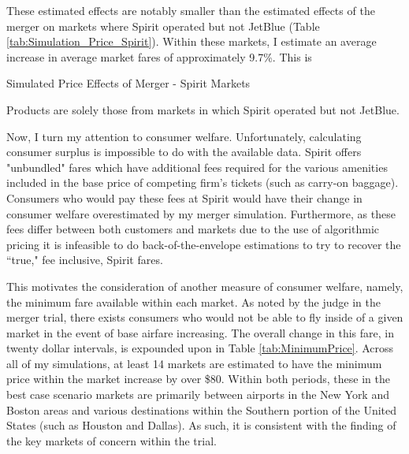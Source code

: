 \documentclass{article}
\begin{document}
    These estimated effects are notably smaller than the estimated effects of the merger on markets where Spirit operated but not JetBlue (Table \ref{tab:Simulation_Price_Spirit}). Within these markets, I estimate an average increase in average market fares of approximately 9.7\%. This is 

    \begin{table}
        \caption{Simulated Price Effects of Merger - Spirit Markets}
        \label{tab:Simulation_Price_Spirit}
                        \vspace{-15mm}
        \begin{center}
              
              \footnotesize{Products are solely those from markets in which Spirit operated but not JetBlue.}
        \end{center}
    \end{table}


     Now, I turn my attention to consumer welfare. Unfortunately, calculating consumer surplus is impossible to do with the available data. Spirit offers "unbundled" fares which have additional fees required for the various amenities included in the base price of competing firm's tickets (such as carry-on baggage). Consumers who would pay these fees at Spirit would have their change in consumer welfare overestimated by my merger simulation. Furthermore, as these fees differ between both customers and markets due to the use of algorithmic pricing \citep{senate_permanent_committee_on_investigations_majority_2024} it is infeasible to do back-of-the-envelope estimations to try to recover the ``true," fee inclusive, Spirit fares. 
     
     This motivates the consideration of another measure of consumer welfare, namely, the minimum fare available within each market. As noted by the judge in the merger trial, there exists consumers who would not be able to fly inside of a given market in the event of base airfare increasing. The overall change in this fare, in twenty dollar intervals, is expounded upon in Table \ref{tab:MinimumPrice}. Across all of my simulations, at least 14 markets are estimated to have the minimum price within the market increase by over \$80. Within both periods, these in the best case scenario markets are primarily between airports in the New York and Boston areas and various destinations within the Southern portion of the United States (such as Houston and Dallas). As such, it is consistent with the finding of the key markets of concern within the trial. 
\end{document}
